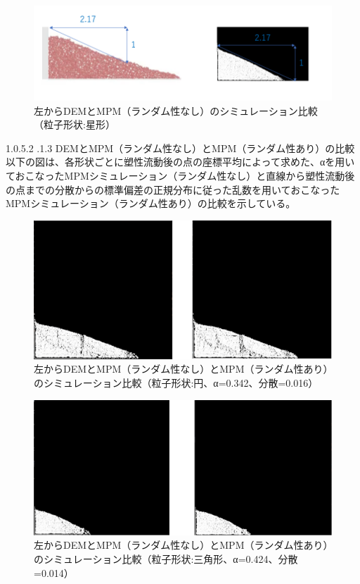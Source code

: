 \documentclass[12pt]{ltjsarticle}
\makeatletter
\renewcommand{\paragraph}{\@startsection{paragraph}{4}{\z@}%
  {1.0\Cvs \@plus.5\Cdp \@minus.2\Cdp}%
  {.1\Cvs \@plus.3\Cdp}%
  {\reset@font\sffamily\normalsize}
}
\makeatother
\begin{document}
\begin{figure}[htbp]
  \centering
  \includegraphics*[keepaspectratio, scale=0.6]{star_ansoku.PNG}
  \caption{左からDEMとMPM（ランダム性なし）のシミュレーション比較（粒子形状:星形）}
  \label{hikaku_ansoku_star}
\end{figure}


\paragraph{DEMとMPM（ランダム性なし）とMPM（ランダム性あり）の比較}
以下の図は、各形状ごとに塑性流動後の点の座標平均によって求めた、αを用いておこなったMPMシミュレーション（ランダム性なし）と直線から塑性流動後の点までの分散からの標準偏差の正規分布に従った乱数を用いておこなったMPMシミュレーション（ランダム性あり）の比較を示している。
\begin{figure}[htbp]
  \centering
  \includegraphics*[keepaspectratio, scale=0.35]{circle_hikaku.PNG}
  \caption{左からDEMとMPM（ランダム性なし）とMPM（ランダム性あり）のシミュレーション比較（粒子形状:円、α=0.342、分散=0.016）}
  \label{hikaku_circle}
\end{figure}

\begin{figure}[htbp]
  \centering
  \includegraphics*[keepaspectratio, scale=0.35]{triangle_hikaku.PNG}
  \caption{左からDEMとMPM（ランダム性なし）とMPM（ランダム性あり）のシミュレーション比較（粒子形状:三角形、α=0.424、分散=0.014）}
  \label{hikaku_triangle}
\end{figure}
\end{document}
